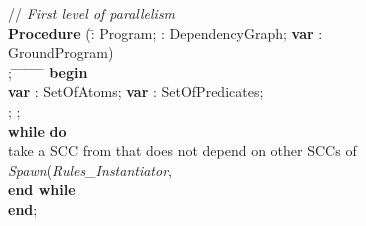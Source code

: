 \documentclass[preprint]{tlp}
\newcommand{\dgp}{\mbox{}}
\begin{document}
\begin{figure}[t!]
\begin{center}
\begin{small}
\begin{tabbing}

// {\em First level of parallelism}\\
{\bf Procedure} (\= : Program;
: DependencyGraph; {\bf var} : GroundProgram)\\;
\hspace*{0.2cm} \= \kill
\hspace*{0.4cm} \= \hspace*{0.4cm} \= \hspace*{0.4cm} \=
\hspace*{0.4cm} \= \hspace*{0.4cm} \= \hspace*{3cm} \=\kill
{\bf begin} \\
\> {\bf var} : SetOfAtoms; {\bf var} : SetOfPredicates;\\
\> ; ; \\
\> {\bf while}  {\bf do}  \hspace{0.7 cm}{\em // until there are components to be processed} \\
\>\> take a SCC  from  that does not depend on other SCCs  of     \\
\>\> {\em Spawn}({\em Rules\_Instantiator},\ \dgp\\
\> {\bf end while} \\
{\bf end}; \\

\\


\end{tabbing}
\end{small}
\end{center}
\end{figure}
\end{document}
